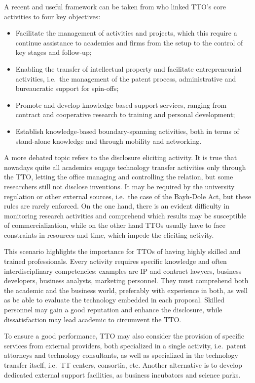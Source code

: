 A recent and useful framework can be taken from \citet{Alexander2013} who linked TTO's core activities to four key objectives: 
\begin{itemize}
\item Facilitate the management of activities and projects, which this require a continue assistance to academics and firms from the setup to the control of key stages and follow-up;
\item Enabling the transfer of intellectual property and facilitate entrepreneurial activities, i.e.\ the management of the patent process, administrative and bureaucratic support for spin-offs;
\item Promote and develop knowledge-based support services, ranging from contract and cooperative research to training and personal development;
\item Establish knowledge-based boundary-spanning activities, both in terms of stand-alone knowledge and through mobility and networking. 
\end{itemize}

A more debated topic refers to the disclosure eliciting activity. It is true that nowadays quite all academics engage technology transfer activities only through the TTO, letting the office managing and controlling the relation, but some researchers still not disclose inventions. It may be required by the university regulation or other external sources, i.e.\ the case of the Bayh-Dole Act, but these rules are rarely enforced. On the one hand, there is an evident difficulty in monitoring research activities and comprehend which results may be susceptible of commercialization, while on the other hand TTOs usually have to face constraints in resources and time, which impede the eliciting activity. 

This scenario highlights the importance for TTOs of having highly skilled and trained professionals. Every activity requires specific knowledge and often interdisciplinary competencies: examples are IP and contract lawyers, business developers, business analysts, marketing personnel. They must comprehend both the academic and the business world, preferably with experience in both, as well as be able to evaluate the technology embedded in each proposal. Skilled personnel may gain a good reputation and enhance the disclosure, while dissatisfaction may lead academic to circumvent the TTO. 

To ensure a good performance, TTO may also consider the provision of specific services from external providers, both specialized in a single activity, i.e.\ patent attorneys and technology consultants, as well as specialized in the technology transfer itself, i.e.\ TT centers, consortia, etc. Another alternative is to develop dedicated external support facilities, as business incubators and science parks.

